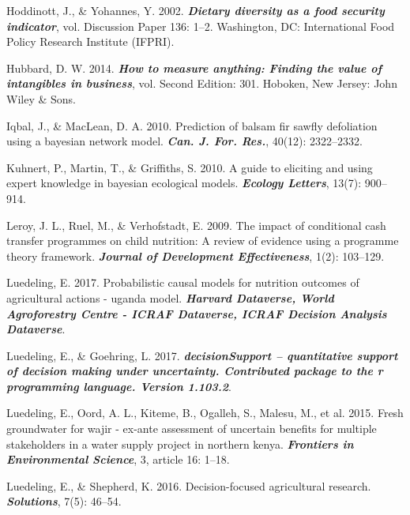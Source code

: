 \documentclass[
]{article}
\newlength{\cslhangindent}
\newlength{\cslentryspacingunit} %
\newenvironment{CSLReferences}[2] %
 {%
  \setlength{\parindent}{0pt}
  \ifodd #1
  \let\oldpar\par
  \def\par{\hangindent=\cslhangindent\oldpar}
  \fi
  \setlength{\parskip}{#2\cslentryspacingunit}
 }%
 {}
\begin{document}
\begin{CSLReferences}{1}{0}
\leavevmode{}%
Hoddinott, J., \& Yohannes, Y. 2002. \textbf{\emph{Dietary diversity as
a food security indicator}}, vol. Discussion Paper 136: 1--2.
Washington, DC: International Food Policy Research Institute (IFPRI).

\leavevmode{}%
Hubbard, D. W. 2014. \textbf{\emph{How to measure anything: Finding the
value of intangibles in business}}, vol. Second Edition: 301. Hoboken,
New Jersey: John Wiley \& Sons.

\leavevmode{}%
Iqbal, J., \& MacLean, D. A. 2010. Prediction of balsam fir sawfly
defoliation using a bayesian network model. \textbf{\emph{Can. J. For.
Res.}}, 40(12): 2322--2332.

\leavevmode{}%
Kuhnert, P., Martin, T., \& Griffiths, S. 2010. A guide to eliciting and
using expert knowledge in bayesian ecological models.
\textbf{\emph{Ecology Letters}}, 13(7): 900--914.

\leavevmode{}%
Leroy, J. L., Ruel, M., \& Verhofstadt, E. 2009. The impact of
conditional cash transfer programmes on child nutrition: A review of
evidence using a programme theory framework. \textbf{\emph{Journal of
Development Effectiveness}}, 1(2): 103--129.

\leavevmode{}%
Luedeling, E. 2017. Probabilistic causal models for nutrition outcomes
of agricultural actions - uganda model. \textbf{\emph{Harvard Dataverse,
World Agroforestry Centre - ICRAF Dataverse, ICRAF Decision Analysis
Dataverse}}.

\leavevmode{}%
Luedeling, E., \& Goehring, L. 2017. \textbf{\emph{decisionSupport --
quantitative support of decision making under uncertainty. Contributed
package to the r programming language. Version 1.103.2}}.

\leavevmode{}%
Luedeling, E., Oord, A. L., Kiteme, B., Ogalleh, S., Malesu, M., et al.
2015. Fresh groundwater for wajir - ex-ante assessment of uncertain
benefits for multiple stakeholders in a water supply project in northern
kenya. \textbf{\emph{Frontiers in Environmental Science}}, 3, article
16: 1--18.

\leavevmode{}%
Luedeling, E., \& Shepherd, K. 2016. Decision-focused agricultural
research. \textbf{\emph{Solutions}}, 7(5): 46--54.


\end{CSLReferences}
\end{document}

